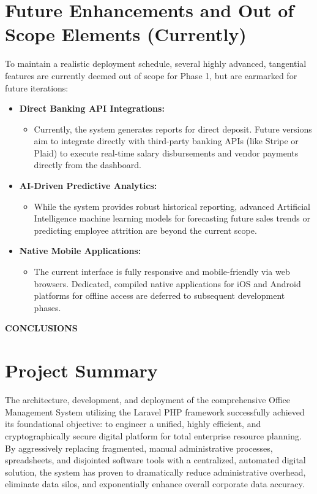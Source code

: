 ﻿\documentclass[12pt,a4paper]{report}
\begin{document}
\section*{Future Enhancements and Out of Scope Elements (Currently)}
To maintain a realistic deployment schedule, several highly advanced, tangential features are currently deemed out of scope for Phase 1, but are earmarked for future iterations:
\begin{itemize}
    \item \textbf{Direct Banking API Integrations:}
    \begin{itemize}
        \item Currently, the system generates reports for direct deposit. Future versions aim to integrate directly with third-party banking APIs (like Stripe or Plaid) to execute real-time salary disbursements and vendor payments directly from the dashboard.
    \end{itemize}
    \item \textbf{AI-Driven Predictive Analytics:}
    \begin{itemize}
        \item While the system provides robust historical reporting, advanced Artificial Intelligence machine learning models for forecasting future sales trends or predicting employee attrition are beyond the current scope.
    \end{itemize}
    \item \textbf{Native Mobile Applications:}
    \begin{itemize}
        \item The current interface is fully responsive and mobile-friendly via web browsers. Dedicated, compiled native applications for iOS and Android platforms for offline access are deferred to subsequent development phases.
    \end{itemize}
\end{itemize}

\newpage
\vspace*{\fill}
\begin{center}
{\LARGE \textbf{CONCLUSIONS}}
\end{center}
\vspace*{\fill}

\newpage
\section*{Project Summary}
The architecture, development, and deployment of the comprehensive Office Management System utilizing the Laravel PHP framework successfully achieved its foundational objective: to engineer a unified, highly efficient, and cryptographically secure digital platform for total enterprise resource planning. By aggressively replacing fragmented, manual administrative processes, spreadsheets, and disjointed software tools with a centralized, automated digital solution, the system has proven to dramatically reduce administrative overhead, eliminate data silos, and exponentially enhance overall corporate data accuracy.
\end{document}
